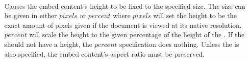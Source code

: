  \\

Causes the embed content's height to be fixed to the specified size. The size can be given in either \inline$pixels$ or \inline$percent$ where \inline$pixels$ will set the height to be the exact amount of pixels given if the document is viewed at its native resolution. \inline$percent$ will scale the height to the given percentage of the height of the . If the  should not have a height, the \inline$percent$ specification does nothing. Unless the  is also specified, the embed content's aspect ratio must be preserved. \\


